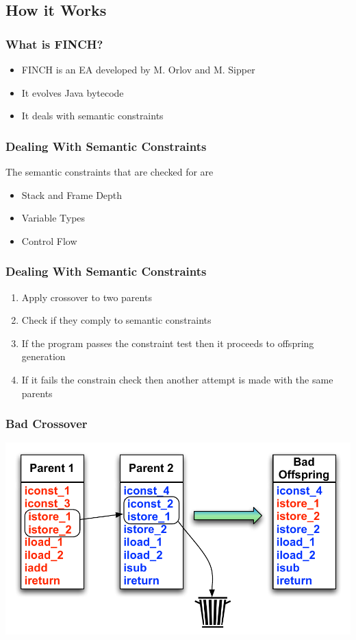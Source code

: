 \documentclass{beamer}
\begin{document}
\subsection[How it works]{How it Works}
\begin{frame}
	\frametitle{What is FINCH?}
	\begin{itemize}
		\item FINCH is an EA developed by M. Orlov and M. Sipper	
		\item It evolves Java bytecode
		\item It deals with semantic constraints
	\end{itemize}
\end{frame}

\begin{frame}
  \frametitle{Dealing With Semantic Constraints}
The semantic constraints that are checked for are

	\begin{itemize}
	\item Stack and Frame Depth
	\item Variable Types
	\item Control Flow
	\end{itemize}

\end{frame}

\begin{frame}
\frametitle{Dealing With Semantic Constraints}
\begin{enumerate}
\item Apply crossover to two parents
\item Check if they comply to semantic constraints
\item If the program passes the constraint test then it proceeds to offspring generation
\item If it fails the constrain check then another attempt is made with the same parents
\end{enumerate}

\end{frame}

\begin{frame}
  \frametitle{Bad Crossover}
  \includegraphics[height=.5\textheight]{Illustrations/badCrossover.pdf}
\end{frame}
\end{document}
